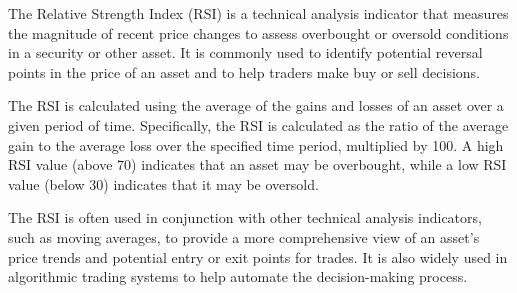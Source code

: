 The Relative Strength Index (RSI) is a technical analysis indicator that measures the magnitude of recent price changes to assess overbought or oversold conditions in a security or other asset. It is commonly used to identify potential reversal points in the price of an asset and to help traders make buy or sell decisions.

The RSI is calculated using the average of the gains and losses of an asset over a given period of time. Specifically, the RSI is calculated as the ratio of the average gain to the average loss over the specified time period, multiplied by 100. A high RSI value (above 70) indicates that an asset may be overbought, while a low RSI value (below 30) indicates that it may be oversold.

The RSI is often used in conjunction with other technical analysis indicators, such as moving averages, to provide a more comprehensive view of an asset's price trends and potential entry or exit points for trades. It is also widely used in algorithmic trading systems to help automate the decision-making process.

